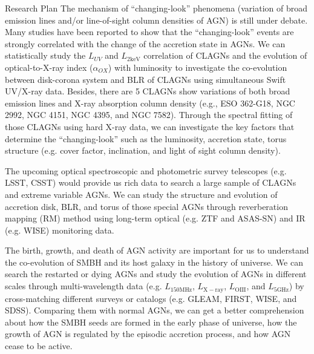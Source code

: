 \prefix{}
\begin{rubric}{Research Plan}
\entry*[Plan 1]
The mechanism of ``changing-look'' phenomena (variation of broad emission lines and/or  line-of-sight column densities of AGN)  is still under debate. Many studies have been reported to show that the ``changing-look'' events are strongly correlated with the change of the accretion state in AGNs. We can statistically study the $L_{UV}$ and $L_\mathrm{2keV}$ correlation of CLAGNs and the evolution of optical-to-X-ray index ($\alpha_{OX}$) with luminosity to investigate the co-evolution between disk-corona system and BLR of CLAGNs using simultaneous Swift UV/X-ray data. Besides, there are 5 CLAGNs show variations of both broad emission lines and X-ray absorption column density (e.g., ESO 362-G18, NGC 2992, NGC 4151, NGC 4395, and NGC 7582). Through the spectral fitting of those CLAGNs using hard X-ray data, we can investigate the key factors that determine the ``changing-look'' such as the luminosity, accretion state, torus structure (e.g. cover factor, inclination, and light of sight column density).

\entry*[Plan 2]
The upcoming optical spectroscopic and photometric survey telescopes (e.g. LSST, CSST) would provide us rich data to search a large sample of CLAGNs and extreme variable AGNs. We can study the structure and evolution of accretion disk, BLR, and torus of those special AGNs through reverberation mapping (RM) method using long-term optical (e.g. ZTF and ASAS-SN) and IR (e.g. WISE) monitoring data. 

\entry*[Plan 3]
The birth, growth, and death of AGN activity are important for us to understand the co-evolution of SMBH and its host galaxy in the history of universe. We can search the restarted or dying AGNs and study the evolution of AGNs in different scales through multi-wavelength data (e.g. $L_\mathrm{150MHz}$, $L_\mathrm{X-ray}$, $L_\mathrm{OIII}$, and $L_\mathrm{5GHz}$) by cross-matching different surveys or catalogs (e.g. GLEAM, FIRST, WISE, and SDSS). Comparing them with normal AGNs, we can get a better comprehension about how the SMBH seeds are formed in the early phase of universe, how the growth of AGN is regulated by the episodic accretion process, and how AGN cease to be active.



\end{rubric}